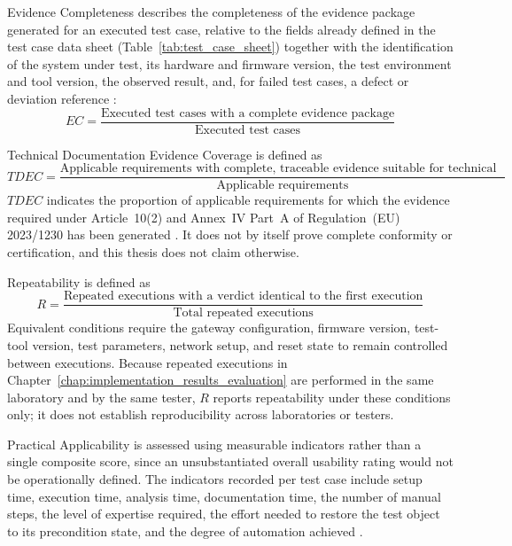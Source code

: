 Evidence Completeness describes the completeness of the evidence package generated for an executed test case, relative to the fields already defined in the test case data sheet (Table~\ref{tab:test_case_sheet}) together with the identification of the system under test, its hardware and firmware version, the test environment and tool version, the observed result, and, for failed test cases, a defect or deviation reference  \cite[p. 219]{Witte2019} \cite[p. 147]{Witte2019}:
\begin{equation}
	EC = \frac{\text{Executed test cases with a complete evidence package}}{\text{Executed test cases}}
\end{equation}



Technical Documentation Evidence Coverage is defined as
\begin{equation}
	TDEC = \frac{\text{Applicable requirements with complete, traceable evidence suitable for technical documentation}}{\text{Applicable requirements}}
\end{equation}
$TDEC$ indicates the proportion of applicable requirements for which the evidence required under Article~10(2) and Annex~IV Part~A of Regulation~(EU) 2023/1230 has been generated \cite{EU2023_1230}. It does not by itself prove complete conformity or certification, and this thesis does not claim otherwise.

Repeatability is defined as
\begin{equation}
	R = \frac{\text{Repeated executions with a verdict identical to the first execution}}{\text{Total repeated executions}}
\end{equation}
Equivalent conditions require the gateway configuration, firmware version, test-tool version, test parameters, network setup, and reset state to remain controlled between executions. Because repeated executions in Chapter~\ref{chap:implementation_results_evaluation} are performed in the same laboratory and by the same tester, $R$ reports repeatability under these conditions only; it does not establish reproducibility across laboratories or testers.

Practical Applicability is assessed using measurable indicators rather than a single composite score, since an unsubstantiated overall usability rating would not be operationally defined. The indicators recorded per test case include setup time, execution time, analysis time, documentation time, the number of manual steps, the level of expertise required, the effort needed to restore the test object to its precondition state, and the degree of automation achieved 
\cite[p. 145]{Witte2019} \cite[p. 228]{Witte2019}.

